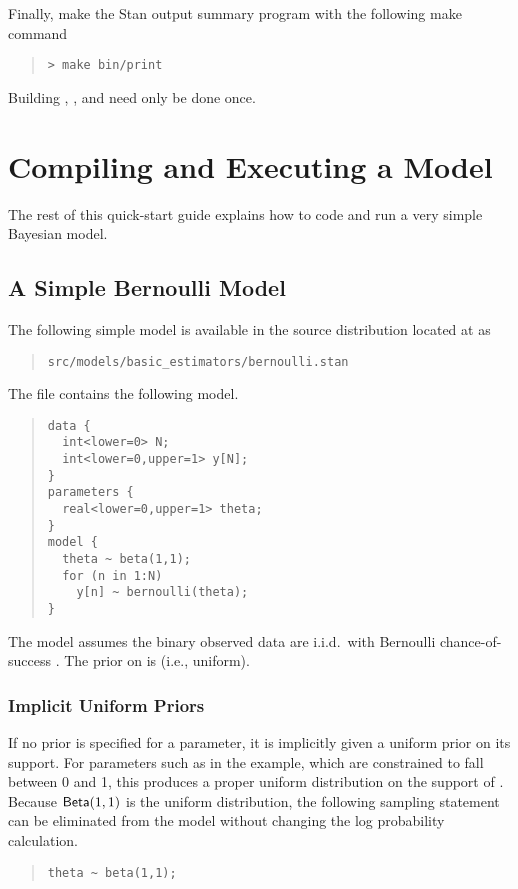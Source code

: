 Finally, make the Stan output summary program with the following
make command
%
\begin{quote}
\begin{Verbatim}[fontshape=sl,fontsize=\small]
> make bin/print
\end{Verbatim}
\end{quote}
%

Building , , and  need only be done once.

\section{Compiling and Executing a Model}

The rest of this quick-start guide explains how to code
and run a very simple Bayesian model.

\subsection{A Simple Bernoulli Model}

The following simple model is available in the source
distribution located at  as
%
\begin{quote}
\nolinkurl{src/models/basic_estimators/bernoulli.stan}
\end{quote}
%
The file contains the following model.
%
\begin{quote}
\begin{Verbatim}[fontsize=\small]
data { 
  int<lower=0> N; 
  int<lower=0,upper=1> y[N];
} 
parameters {
  real<lower=0,upper=1> theta;
} 
model {
  theta ~ beta(1,1);
  for (n in 1:N) 
    y[n] ~ bernoulli(theta);
}
\end{Verbatim}
\end{quote}
%
The model assumes the binary observed data 
are i.i.d.\ with Bernoulli chance-of-success .  The
prior on  is  (i.e., uniform).

\subsubsection{Implicit Uniform Priors}

If no prior is specified for a parameter, it is implicitly given a
uniform prior on its support.  For parameters such as  in
the example, which are constrained to fall between 0 and 1, this
produces a proper uniform distribution on the support of .
Because $\mbox{\sf Beta}(1,1)$ is the uniform distribution, the
following sampling statement can be eliminated from the model without
changing the log probability calculation.
%
\begin{quote}
\begin{Verbatim}[fontsize=\small]
  theta ~ beta(1,1);
\end{Verbatim}
\end{quote}

